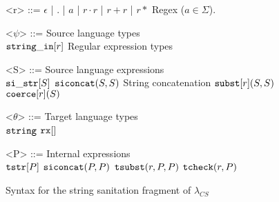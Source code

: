 \documentclass[10pt,preprint]{sigplanconf}
\theoremstyle{definition}
\newcommand{\sisubst}[3]{{\tt subst}[#1](#2,#3)}
\newcommand{\coerce}[2]{ {\tt coerce}[#1](#2)}
\newcommand{\sistr}[1]{{\tt si\_str}[#1]}
\newcommand{\strin}[1]{\sistr{#1}}
\newcommand{\siconcat}[2]{{\tt siconcat}(#1,#2)}
\newcommand{\stringin}[1]{{\tt string\_in}[#1]}
\newcommand{\tsubst}[3]{{\tt tsubst}(#1,#2,#3)}
\newcommand{\tcheck}[2]{{\tt tcheck}(#1, #2)}
\renewcommand{\tstr}[1]{{{\tt tstr}[#1]}}
\newcommand{\str}{{\tt string}}
\newcommand{\regext}[1]{ {\tt rx}[#1] }
\newcommand{\lcs}{\lambda_{CS}}
\begin{document}
%
%

\renewcommand{\grammarlabel}[2]{#1\hfill#2}

\begin{figure}
\begin{grammar}
<r> ::= $\epsilon$ | $.$ | $a$ | $r \cdot r$ | $r + r$ | $r*$ \hfill Regex ($a \in \Sigma$).

<$\psi$> ::=				\hfill	Source language types					\\
$\stringin{r}$				\hfill Regular expression types \alt

<S> ::= \hfill Source language expressions \\
      $\strin{S}$ \alt
      $\siconcat{S}{S}$ \hfill String concatenation \alt
      $\sisubst{r}{S}{S}$ \alt
      $\coerce{r}{S}$

<$\theta$> ::= \hfill Target language types \\
$\str$ \alt $\regext$

<P> ::= \hfill Internal expressions \\
  $\tstr{P}$ \alt
  $\siconcat{P}{P}$ \alt
  $\tsubst{r}{P}{P}$ \alt
  $\tcheck{r}{P}$
\end{grammar}
\caption{Syntax for the string sanitation fragment of $\lcs$}
\label{fig:lcsSyntax}
\end{figure}
\end{document}
